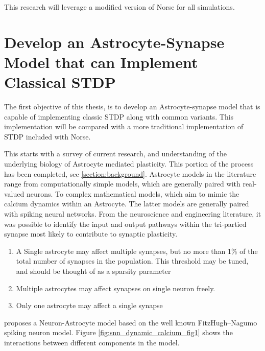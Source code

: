     This research will leverage a modified version of Norse for all simulations.
    
    \section{Develop an Astrocyte-Synapse Model that can Implement Classical STDP}
    
    The first objective of this thesis, is to develop an Astrocyte-synapse model
    that is capable of implementing classic STDP along with common
    variants. This implementation will be compared with a more traditional
    implementation of STDP included with Norse.
    
    This starts with a survey of current research, and understanding of the
    underlying biology of Astrocyte mediated plasticity. This portion of the
    process has been completed, see \ref{section:background}. Astrocyte models
    in the literature range from computationally simple models, which are
    generally paired with real-valued neurons. To complex mathematical models,
    which aim to mimic the calcium dynamics within an Astrocyte. The latter
    models are generally paired with spiking neural networks. From the
    neuroscience and engineering literature, it was possible to identify the
    input and output pathways within the tri-partied synapse most likely to
    contribute to synaptic plasticity.
    
    \begin{enumerate}
        \item A Single astrocyte may affect multiple synapses, but no more than
          1\% of the total number of synapses in the population. This threshold
          may be tuned, and should be thought of as a sparsity parameter
        \item Multiple astrocytes may affect synapses on single neuron freely.
        \item Only one astrocyte may affect a single synapse
    \end{enumerate}
    

    
    \cite{snn_dynamic_calcium} proposes a Neuron-Astrocyte model based on the
    well known FitzHugh–Nagumo spiking neuron model. Figure
    \ref{fig:snn_dynamic_calcium_fig1} shows the interactions between different
    components in the model.
    
    
